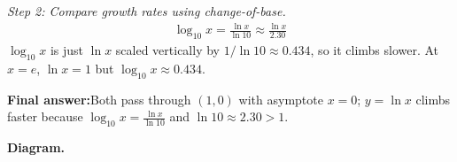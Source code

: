 \documentclass[11pt]{article}
\begin{document}
\textit{Step 2: Compare growth rates using change-of-base.}
\[\begin{gathered}
\log_{10} x = \frac{\ln x}{\ln 10} \approx \frac{\ln x}{2.30}
\end{gathered}\]
\( \log_{10} x \) is just \( \ln x \) scaled vertically by \( 1/\ln 10 \approx 0.434 \), so it climbs slower. At \( x = e \), \( \ln x = 1 \) but \( \log_{10} x \approx 0.434 \).

\begin{answerbox}
\textbf{Final answer:}\quad Both pass through \(\displaystyle (1, 0)\) with asymptote \(\displaystyle  x = 0 \); \(\displaystyle  y = \ln x \) climbs faster because \(\displaystyle  \log_{10} x = \frac{\ln x}{\ln 10} \) and \(\displaystyle  \ln 10 \approx 2.30 > 1 \).
\end{answerbox}
\textbf{Diagram.}
\end{document}
